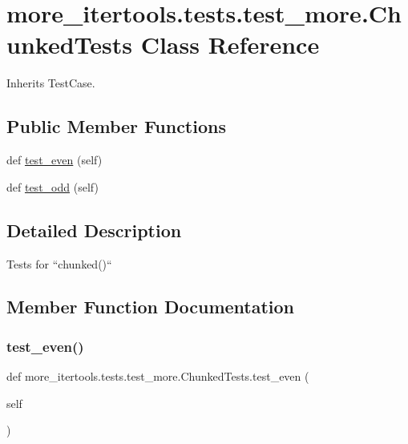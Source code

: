 \hypertarget{classmore__itertools_1_1tests_1_1test__more_1_1_chunked_tests}{}\section{more\+\_\+itertools.\+tests.\+test\+\_\+more.\+Chunked\+Tests Class Reference}
\label{classmore__itertools_1_1tests_1_1test__more_1_1_chunked_tests}


Inherits Test\+Case.

\subsection*{Public Member Functions}
\begin{DoxyCompactItemize}
\item 
def \hyperlink{classmore__itertools_1_1tests_1_1test__more_1_1_chunked_tests_a476cd5c5ab2dd9a407eb7bda6cd155eb}{test\+\_\+even} (self)
\item 
def \hyperlink{classmore__itertools_1_1tests_1_1test__more_1_1_chunked_tests_a1b03bc295efd9d71ee675d5e77f39866}{test\+\_\+odd} (self)
\end{DoxyCompactItemize}


\subsection{Detailed Description}
\begin{DoxyVerb}Tests for ``chunked()``\end{DoxyVerb}
 

\subsection{Member Function Documentation}
\mbox{\label{classmore__itertools_1_1tests_1_1test__more_1_1_chunked_tests_a476cd5c5ab2dd9a407eb7bda6cd155eb}} 
\subsubsection{\texorpdfstring{test\+\_\+even()}{test\_even()}}
{\footnotesize\ttfamily def more\+\_\+itertools.\+tests.\+test\+\_\+more.\+Chunked\+Tests.\+test\+\_\+even (\begin{DoxyParamCaption}\item[{}]{self }\end{DoxyParamCaption})}

